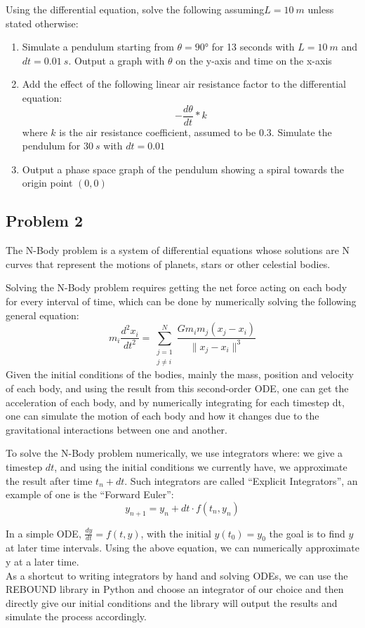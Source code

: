 \documentclass[12pt]{article}
\begin{document}
Using the differential equation, solve the following assuming$ L=10\ m$ unless stated otherwise:
\begin{enumerate}
    \item Simulate a pendulum starting from $\theta=90$° for 13 seconds with $L=10\ m$ and $dt=0.01\ s$. Output a graph with $\theta$ on the y-axis and time on the x-axis
    \item Add the effect of the following linear air resistance factor to the differential equation:
    $$-\frac{d\theta}{dt}\ast k$$
    where $k$ is the air resistance coefficient, assumed to be $0.3$. Simulate the pendulum for $30\ s$ with $dt=0.01$
    \item 	Output a phase space graph of the pendulum showing a spiral towards the origin point $(0,0)$
\end{enumerate}

\newpage
\subsection{Problem 2}

The N-Body problem is a system of differential equations whose solutions are N curves that represent the motions of planets, stars or other celestial bodies.

Solving the N-Body problem requires getting the net force acting on each body for every interval of time, which can be done by numerically solving the following general equation:
$$m_i \frac{d^2 x_i}{dt^2} = \sum_{\substack{j=1 \\ j \ne i}}^{N} \frac{G m_i m_j (x_j - x_i)}{\|x_j - x_i\|^3}$$
Given the initial conditions of the bodies, mainly the mass, position and velocity of each body, and using the result from this second-order ODE, one can get the acceleration of each body, and by numerically integrating for each timestep dt, one can simulate the motion of each body and how it changes due to the gravitational interactions between one and another.

To solve the N-Body problem numerically, we use integrators where: we give a timestep $dt$, and using the initial conditions we currently have, we approximate the result after time $t_n+dt$. Such integrators are called “Explicit Integrators”, an example of one is the “Forward Euler”:
$$y_{n+1}=y_n+dt\cdot f(t_n,y_n)$$

In a simple ODE, $\frac{dy}{dt}=f\left(t,y\right)$, with the initial $y\left(t_0\right)=y_0$ the goal is to find $y$ at later time intervals. Using the above equation, we can numerically approximate y at a later time.\\
As a shortcut to writing integrators by hand and solving ODEs, we can use the REBOUND library in Python and choose an integrator of our choice and then directly give our initial conditions and the library will output the results and simulate the process accordingly.
\end{document}
